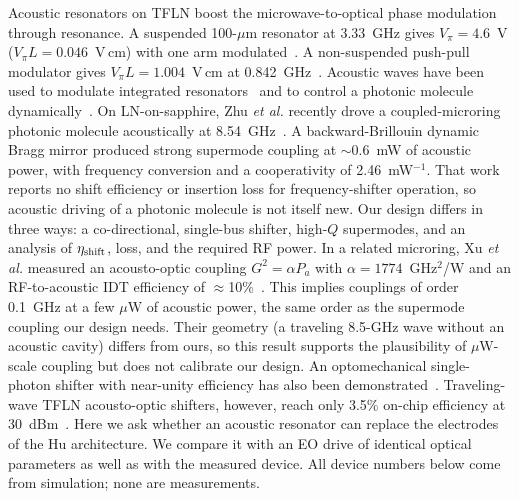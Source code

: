 \documentclass[aps,prl,reprint,superscriptaddress,amsmath,amssymb,floatfix]{revtex4-2}
\newcommand{\etash}{\eta_{\rm shift}}
\begin{document}
Acoustic resonators on TFLN boost the microwave-to-optical phase modulation through resonance. A suspended 100-$\mu$m resonator at 3.33~GHz gives $V_\pi=4.6$~V ($V_\pi L=0.046$~V\,cm) with one arm modulated~\cite{Shao2019}. A non-suspended push-pull modulator gives $V_\pi L=1.004$~V\,cm at 0.842~GHz~\cite{Ni2026}. Acoustic waves have been used to modulate integrated resonators~\cite{Tadesse2014} and to control a photonic molecule dynamically~\cite{Kapfinger2015}. On LN-on-sapphire, Zhu \emph{et al.} recently drove a coupled-microring photonic molecule acoustically at 8.54~GHz~\cite{Zhu2025ao}. A backward-Brillouin dynamic Bragg mirror produced strong supermode coupling at $\sim$0.6~mW of acoustic power, with frequency conversion and a cooperativity of 2.46~mW$^{-1}$. That work reports no shift efficiency or insertion loss for frequency-shifter operation, so acoustic driving of a photonic molecule is not itself new. Our design differs in three ways: a co-directional, single-bus shifter, high-$Q$ supermodes, and an analysis of $\etash$, loss, and the required RF power. In a related microring, Xu \emph{et al.} measured an acousto-optic coupling $G^2=\alpha P_a$ with $\alpha=1774$~GHz$^2$/W and an RF-to-acoustic IDT efficiency of $\approx$10\%~\cite{Xu2025b}. This implies couplings of order 0.1~GHz at a few $\mu$W of acoustic power, the same order as the supermode coupling our design needs. Their geometry (a traveling 8.5-GHz wave without an acoustic cavity) differs from ours, so this result supports the plausibility of $\mu$W-scale coupling but does not calibrate our design. An optomechanical single-photon shifter with near-unity efficiency has also been demonstrated~\cite{Fan2016}. %
Traveling-wave TFLN acousto-optic shifters, however, reach only 3.5\% on-chip efficiency at 30~dBm~\cite{Shao2020}. Here we ask whether an acoustic resonator can replace the electrodes of the Hu architecture. We compare it with an EO drive of identical optical parameters as well as with the measured device. All device numbers below come from simulation; none are measurements.
\end{document}

